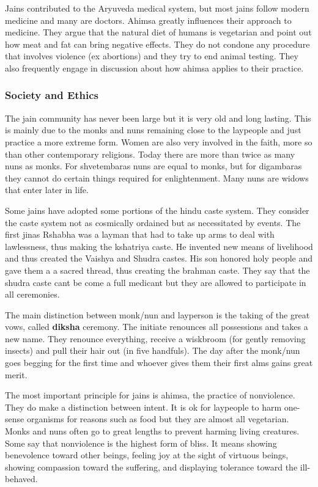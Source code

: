 \documentclass{article}
\begin{document}
Jains contributed to the Aryuveda medical system, but most jains follow modern medicine and many are doctors. Ahimsa greatly influences their approach to medicine. They argue that the natural diet of humans is vegetarian and point out how meat and fat can bring negative effects. They do not condone any procedure that involves violence (ex abortions) and they try to end animal testing. They also frequently engage in discussion about how ahimsa applies to their practice.

\subsubsection*{Society and Ethics}
\label{ssub:society_and_ethics}
The jain community has never been large but it is very old and long lasting. This is mainly due to the monks and nuns remaining close to the laypeople and just practice a more extreme form. Women are also very involved in the faith, more so than other contemporary religions. Today there are more than twice as many nuns as monks. For shvetembaras nuns are equal to monks, but for digambaras they cannot do certain things required for enlightenment.  Many nuns are widows that enter later in life.

Some jains have adopted some portions of the hindu caste system. They consider the caste system not as cosmically ordained but as necessitated by events. The first jinas Rshabha was a layman that had to take up arms to deal with lawlessness, thus making the kshatriya caste. He invented new means of livelihood and thus created the Vaishya and Shudra castes. His son honored holy people and gave them a a sacred thread, thus creating the brahman caste. They say that the shudra caste cant be come a full medicant but they are allowed to participate in all ceremonies.

The main distinction between monk/nun and layperson is the taking of the great vows, called \textbf{diksha} ceremony. The initiate renounces all possessions and takes a new name. They renounce everything, receive a wiskbroom (for gently removing insects) and pull their hair out (in five handfuls). The day after the monk/nun goes begging for the first time and whoever gives them their first alms gains great merit.

The most important principle for jains is ahimsa, the practice of nonviolence. They do make a distinction between intent. It is ok for laypeople to harm one-sense organisms for reasons such as food but they are almost all vegetarian. Monks and nuns often go to great lengths to prevent harming living creatures. Some say that nonviolence is the highest form of bliss. It means showing benevolence toward other beings, feeling joy at the sight of virtuous beings, showing compassion toward the suffering, and displaying tolerance toward the ill-behaved.
\end{document}
